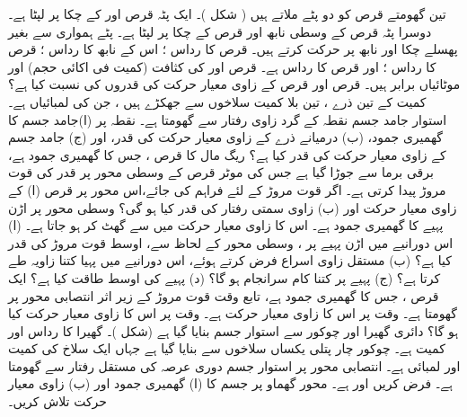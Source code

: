تین گھومتے قرص کو دو پٹے  ملاتے ہیں ( شکل  )۔ ایک پٹہ قرص  اور  کے چکا پر لپٹا ہے۔ دوسرا پٹہ  قرص  کے وسطی  نابھ اور قرص  کے چکا پر لپٹا ہے۔ پٹے ہمواری سے  بغیر پھسلے چکا  اور نابھ پر  حرکت کرتے ہیں۔ قرص  کا رداس ؛ اس کے نابھ کا رداس ؛ قرص  کا رداس ؛ اور قرص  کا رداس  ہے۔ قرص  اور  کی کثافت  (کمیت فی اکائی حجم) اور موٹائیاں   برابر ہیں۔ قرص  اور  قرص   کے زاوی معیار حرکت کی قدروں کی نسبت کیا ہے؟
کمیت  کے تین ذرے ، تین   بلا کمیت سلاخوں سے جھکڑے ہیں ، جن کی لمبائیاں  ہے۔  استوار   جامد جسم نقطہ  کے گرد زاوی رفتار  سے گھومتا ہے۔ نقطہ  پر (ا)جامد جسم کا  گھمیری جمود، (ب)  درمیانے ذرے کے زاوی معیار حرکت کی قدر، اور (ج)  جامد جسم کے زاوی معیار حرکت کی قدر کیا ہے؟
ریگ مال کا   قرص ، جس کا گھمیری جمود  ہے، برقی برما سے  جوڑا گیا ہے جس کی موٹر  قرص کے وسطی محور 
پر   قدر کی قوت مروڑ پیدا کرتی ہے۔ اگر قوت مروڑ  کے لئے فراہم کی جائے،اس محور پر  قرص   (ا) کے زاوی معیار حرکت اور (ب) زاوی سمتی رفتار کی قدر کیا ہو گی؟
وسطی محور پر اڑن پہیے  کا  گھمیری جمود  ہے۔  اس کا زاوی معیار حرکت  میں 
 سے گھٹ کر  ہو جاتا ہے۔ (ا)  اس دورانیے میں  اڑن پہیے پر ، وسطی محور  کے لحاظ سے، اوسط قوت مروڑ کی قدر  کیا ہے؟ (ب)  مستقل زاوی اسراع فرض کرتے ہوئے، اس دورانیے میں پہیا کتنا زاویہ طے کرتا ہے؟ (ج)  پہیے پر کتنا کام سرانجام ہو گا؟  (د)  پہیے کی اوسط طاقت کیا ہے؟
ایک قرص ، جس کا گھمیری جمود  ہے، تابع وقت قوت مروڑ  کے زیر اثر  انتصابی محور پر گھومتا ہے۔ وقت  پر اس کا زاوی معیار حرکت  ہے۔ وقت  پر اس کا زاوی معیار حرکت کیا ہو گا؟
دائری گھیرا اور چوکور سے استوار جسم بنایا گیا ہے (شکل )۔ گھیرا کا رداس  اور کمیت  ہے۔ چوکور چار پتلی یکساں  سلاخوں سے بنایا گیا ہے جہاں ایک سلاخ کی کمیت  اور لمبائی  ہے۔ انتصابی محور پر استوار جسم   دوری عرصہ کی مستقل رفتار سے گھومتا ہے۔ فرض کریں  اور  ہے۔ محور گھماو پر جسم کا  (ا) گھمیری جمود اور (ب)   زاوی معیار حرکت تلاش کریں۔
